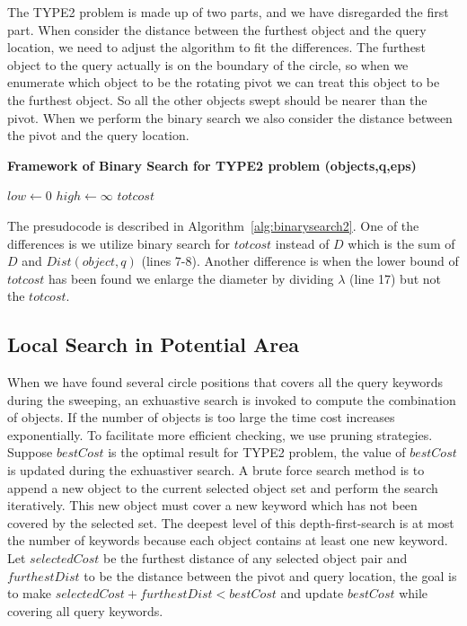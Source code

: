 \documentclass{sig-alternate}
\begin{document}
The \textsf{TYPE2} problem is made up of two parts, and we have disregarded the
first part. When consider the distance between the furthest object and the query location,
we need to adjust the algorithm to fit the differences. The furthest object to the
query actually is on the boundary of the circle, so when we enumerate which object
to be the rotating pivot we can treat this object to be the furthest object. So all
the other objects swept should be nearer than the pivot. When we perform the binary search
we also consider the distance between the pivot and the query location.

\begin{algorithm}[!ht]\small\label{alg:binarysearch2}
\caption{ \bf {Framework of Binary Search for TYPE2 problem} (objects,q,eps)}

$low \gets 0$\;
$high \gets \infty$\;
\Return $totcost$\;\vspace{-1ex}

\end{algorithm}

The presudocode is described in Algorithm~\ref{alg:binarysearch2}. One of the differences
is we utilize binary search for $totcost$ instead of $D$ which is the sum of $D$ and $Dist(object,q)$ (lines 7-8).
Another difference is when the lower bound of $totcost$ has been found we enlarge the diameter by dividing $\lambda$ (line 17)
but not the $totcost$.

\subsection{Local Search in Potential Area}\label{subsec:search}
When we have found several circle positions that covers all the query keywords during the sweeping,
an exhuastive search is invoked to compute the combination of objects. If the number of objects
is too large the time cost increases exponentially. To facilitate more efficient checking,
we use pruning strategies. Suppose $bestCost$ is the optimal result for \textsf{TYPE2} problem,
the value of $bestCost$ is updated during the exhuastiver search. 
A brute force search method is to append a new object to the current selected object set and
perform the search iteratively.
This new object must cover a new keyword which has not been covered by the selected set.
The deepest level of this depth-first-search is at most the number of keywords because each object
contains at least one new keyword.
Let $selectedCost$ be the furthest distance of any selected object pair and
$furthestDist$ to be the distance between the pivot and query location, the goal is to
make $selectedCost+furthestDist<bestCost$ and update $bestCost$ while covering all query keywords.
%
\end{document}
